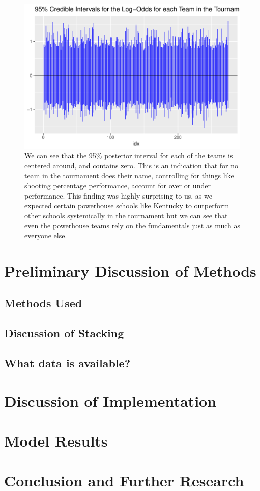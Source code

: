 \documentclass[10pt,a4paper, hidelinks]{article} %
\begin{document}
\begin{figure}[H]
	\centering
	\includegraphics[width=0.7\linewidth]{../fig/polr_team_log_odds}
	\caption{We can see that the 95\% posterior interval for each of the teams is centered around, and contains zero. This is an indication that for no team in the tournament does their name, controlling for things like shooting percentage performance, account for over or under performance. This finding was highly surprising to us, as we expected certain powerhouse schools like Kentucky to outperform other schools systemically in the tournament but we can see that even the powerhouse teams rely on the fundamentals just as much as everyone else.}
	\label{fig:polrteamlogodds}
\end{figure}


\section{Preliminary Discussion of Methods}

\subsection{Methods Used}
 \subsection{Discussion of Stacking}
\subsection{What data is available?}
\section{Discussion of Implementation}

\section{Model Results}

\section{Conclusion and Further Research}
\end{document}

